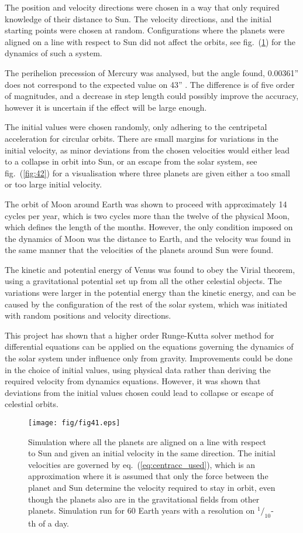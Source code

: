 \documentclass[a4paper,11pt]{article}
\begin{document}
The position and velocity directions were chosen in a way that only required knowledge of their distance to Sun. The velocity directions, and the initial starting points were chosen at random. Configurations where the planets were aligned on a line with respect to Sun did not affect the orbits, see fig.~(\ref{fig:41}) for the dynamics of such a system. 

The perihelion precession of Mercury was analysed, but the angle found, 0.00361'' does not correspond to the expected value on 43'' \cite{Wiki:Perihelion}. The difference is of five order of magnitudes, and a decrease in step length could possibly improve the accuracy, however it is uncertain if the effect will be large enough. 

The initial values were chosen randomly, only adhering to the centripetal acceleration for circular orbits. There are small margins for variations in the initial velocity, as minor deviations from the chosen velocities would either lead to a collapse in orbit into Sun, or an escape from the solar system, see fig.~(\ref{fig:42}) for a visualisation where three planets are given either a too small or too large initial velocity.

The orbit of Moon around Earth was shown to proceed with approximately 14 cycles per year, which is two cycles more than the twelve of the physical Moon, which defines the length of the months. However, the only condition imposed on the dynamics of Moon was the distance to Earth, and the velocity was found in the same manner that the velocities of the planets around Sun were found.

The kinetic and potential energy of Venus was found to obey the Virial theorem, using a gravitational potential set up from all the other celestial objects. The variations were larger in the potential energy than the kinetic energy, and can be caused by the configuration of the rest of the solar system, which was initiated with random positions and velocity directions.

This project has shown that a higher order Runge-Kutta solver method for differential equations can be applied on the equations governing the dynamics of the solar system under influence only from gravity. Improvements could be done in the choice of initial values, using physical data rather than deriving the required velocity from dynamics equations. However, it was shown that deviations from the initial values chosen could lead to collapse or escape of celestial orbits.

\begin{figure}[htb]
    \centering
    \texttt{[image: fig/fig41.eps]}
    \caption{Simulation where all the planets are aligned on a line with respect to Sun and given an initial velocity in the same direction. The initial velocities are governed by eq.~(\ref{eq:centracc_used}), which is an approximation where it is assumed that only the force between the planet and Sun determine the velocity required to stay in orbit, even though the planets also are in the gravitational fields from other planets. Simulation run for 60 Earth years with a resolution on $^1\!/_{10}$-th of a day.}
    \label{fig:41}
\end{figure}
\end{document}
